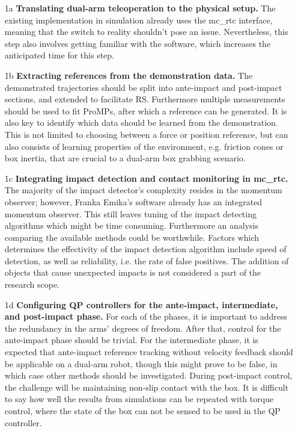 \documentclass[11pt]{report}
\numberwithin{equation}{section}        %
\numberwithin{figure}{section}          %
\numberwithin{table}{section}           %
\begin{document}
  \begin{enumerate}
  \item[1a] \textbf{Translating dual-arm teleoperation to the physical setup.} The existing implementation in simulation already uses the mc\_rtc interface, meaning that the switch to reality shouldn't pose an issue. Nevertheless, this step also involves getting familiar with the software, which increases the anticipated time for this step.
  \item[1b] \textbf{Extracting references from the demonstration data.} The demonstrated trajectories should be split into ante-impact and post-impact sections, and extended to facilitate RS. Furthermore multiple measurements should be used to fit ProMPs, after which a reference can be generated. It is also key to identify which data should be learned from the demonstration. This is not limited to choosing between a force or position reference, but can also consists of learning properties of the environment, e.g. friction cones or box inertia, that are crucial to a dual-arm box grabbing scenario.
  \item[1c] \textbf{Integrating impact detection and contact monitoring in mc\_rtc.} The majority of the impact detector's complexity resides in the momentum observer; however, Franka Emika's software already has an integrated momentum observer. This still leaves tuning of the impact detecting algorithms which might be time consuming. Furthermore an analysis comparing the available methods could be worthwhile. Factors which determines the effectivity of the impact detection algorithm include speed of detection, as well as reliability, i.e. the rate of false positives. The addition of objects that cause unexpected impacts is not considered a part of the research scope.
  \item[1d] \textbf{Configuring QP controllers for the ante-impact, intermediate, and post-impact phase.} For each of the phases, it is important to address the redundancy in the arms' degrees of freedom. After that, control for the ante-impact phase should be trivial. For the intermediate phase, it is expected that ante-impact reference tracking without velocity feedback should be applicable on a dual-arm robot, though this might prove to be false, in which case other methods should be investigated. During post-impact control, the challenge will be maintaining non-slip contact with the box. It is difficult to say how well the results from simulations can be repeated with torque control, where the state of the box can not be sensed to be used in the QP controller.

\end{enumerate}
\end{document}
